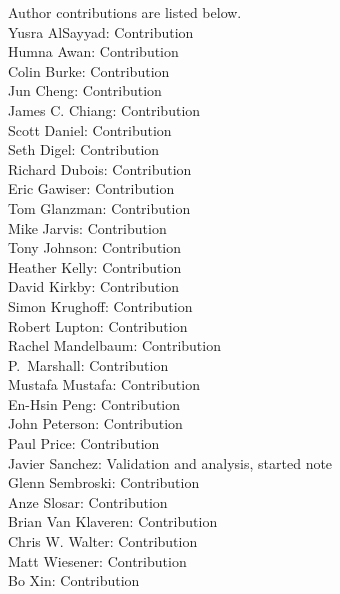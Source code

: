 Author contributions are listed below. \\
Yusra AlSayyad: Contribution \\
Humna Awan: Contribution \\
Colin Burke: Contribution \\
Jun Cheng: Contribution \\
James C. Chiang: Contribution \\
Scott Daniel: Contribution \\
Seth Digel: Contribution \\
Richard Dubois: Contribution \\
Eric Gawiser: Contribution \\
Tom Glanzman: Contribution \\
Mike Jarvis: Contribution \\
Tony Johnson: Contribution \\
Heather Kelly: Contribution \\
David Kirkby: Contribution \\
Simon Krughoff: Contribution \\
Robert Lupton: Contribution \\
Rachel Mandelbaum: Contribution \\
P.~Marshall: Contribution \\
Mustafa Mustafa: Contribution \\
En-Hsin Peng: Contribution \\
John Peterson: Contribution \\
Paul Price: Contribution \\
Javier Sanchez: Validation and analysis, started note \\
Glenn Sembroski: Contribution \\
Anze Slosar: Contribution \\
Brian Van Klaveren: Contribution \\
Chris W. Walter: Contribution \\
Matt Wiesener: Contribution \\
Bo Xin: Contribution \\
